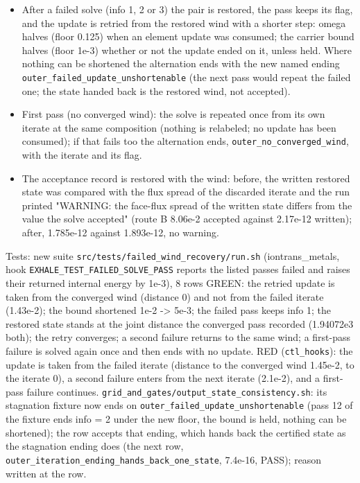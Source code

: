 \documentclass[english,a4paper]{my_memo}
\providecommand{\tightlist}{\setlength{\itemsep}{0pt}\setlength{\parskip}{0pt}}
\begin{document}
\begin{itemize}
\tightlist
\item
  After a failed solve (info 1, 2 or 3) the pair is restored, the pass keeps its flag, and the update is retried from the restored wind with a shorter step: omega halves (floor 0.125) when an element update was consumed; the carrier bound halves (floor 1e-3) whether or not the update ended on it, unless held. Where nothing can be shortened the alternation ends with the new named ending \texttt{outer\_failed\_update\_unshortenable} (the next pass would repeat the failed one; the state handed back is the restored wind, not accepted).
\item
  First pass (no converged wind): the solve is repeated once from its own iterate at the same composition (nothing is relabeled; no update has been consumed); if that fails too the alternation ends, \texttt{outer\_no\_converged\_wind}, with the iterate and its flag.
\item
  The acceptance record is restored with the wind: before, the written restored state was compared with the flux spread of the discarded iterate and the run printed "WARNING: the face-flux spread of the written state differs from the value the solve accepted" (route B 8.06e-2 accepted against 2.17e-12 written); after, 1.785e-12 against 1.893e-12, no warning.
\end{itemize}

Tests: new suite \texttt{src/tests/failed\_wind\_recovery/run.sh} (iontrans\_metals, hook \texttt{EXHALE\_TEST\_FAILED\_SOLVE\_PASS} reports the listed passes failed and raises their returned internal energy by 1e-3), 8 rows GREEN: the retried update is taken from the converged wind (distance 0) and not from the failed iterate (1.43e-2); the bound shortened 1e-2 -\textgreater{} 5e-3; the failed pass keeps info 1; the restored state stands at the joint distance the converged pass recorded (1.94072e3 both); the retry converges; a second failure returns to the same wind; a first-pass failure is solved again once and then ends with no update. RED (\texttt{ctl\_hooks}): the update is taken from the failed iterate (distance to the converged wind 1.45e-2, to the iterate 0), a second failure enters from the next iterate (2.1e-2), and a first-pass failure continues. \texttt{grid\_and\_gates/output\_state\_consistency.sh}: its stagnation fixture now ends on \texttt{outer\_failed\_update\_unshortenable} (pass 12 of the fixture ends info = 2 under the new floor, the bound is held, nothing can be shortened); the row accepts that ending, which hands back the certified state as the stagnation ending does (the next row, \texttt{outer\_iteration\_ending\_hands\_back\_one\_state}, 7.4e-16, PASS); reason written at the row.
\end{document}
